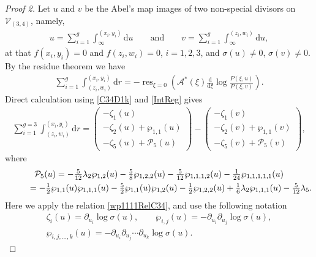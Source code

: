 \documentclass[11pt]{article}
\numberwithin{equation}{section}
\DeclareMathOperator{\res}{res}
\newcommand{\rmd}{\mathrm{d}}
\begin{document}
\begin{proof}[Proof 2]
Let $u$ and $v$ be the Abel's map images of two non-special divisors on $\mathcal{V}_{(3,4)}$, namely,
\begin{gather}\label{uDefC34}
 u = \sum_{i=1}^g \int_{\infty}^{(x_i,y_i)} \rmd u \qquad \text{and}\qquad v = \sum_{i=1}^g \int_{\infty}^{(z_i,w_i)} \rmd u,
\end{gather}
at that $f(x_i,y_i)=0$ and $f(z_i,w_i)=0$, $i=1,2,3$, and $\sigma(u) \neq 0$, $\sigma(v) \neq 0$. By the residue theorem we have
\begin{gather}\label{ZetaDef}
 \sum_{i=1}^{g} \int^{(x_i,y_i)}_{(z_i,w_i)} \rmd r = -\res_{\xi=0}\left( \mathcal{A}^{\ast}(\xi) \frac{\rmd}{\rmd \xi}\log \frac{P(\xi,u)}{P(\xi,v)}\right).
\end{gather}
Direct calculation using \eqref{C34D1k} and \eqref{IntReg} gives
\begin{gather}\label{zetaC34}
 \sum_{i=1}^{g=3} \int_{(z_i,w_i)}^{(x_i,y_i)} \rmd r = \begin{pmatrix}
 -\zeta_1(u) \\
 -\zeta_2(u) + \wp_{1,1}(u)\\
 -\zeta_5(u) + \mathcal{P}_5(u) \end{pmatrix}
 - \begin{pmatrix}
 -\zeta_1(v) \\
 -\zeta_2(v) + \wp_{1,1}(v)\\
 -\zeta_5(v) + \mathcal{P}_5(v) \end{pmatrix},
\end{gather}
where
\begin{gather*}
\mathcal{P}_5(u) = -\tfrac{5}{12} \lambda_2 \wp _{1,2}(u) -\tfrac{5}{8} \wp_{1,2,2}(u)
-\tfrac{5}{12} \wp_{1,1,1,2}(u) -\tfrac{1}{24} \wp_{1,1,1,1,1}(u)
\\
\hphantom{\mathcal{P}_5(u)}{} = -\tfrac{1}{2} \wp_{1,1}(u)\wp_{1,1,1}(u) - \tfrac{5}{2} \wp_{1,1}(u)\wp_{1,2}(u)
-\tfrac{1}{2} \wp_{1,2,2}(u) + \tfrac{1}{6} \lambda_2 \wp_{1,1,1}(u) - \tfrac{5}{12}\lambda_5.
\end{gather*}
Here we apply the relation \eqref{wp1111RelC34}, and use the following notation
\begin{gather}
\zeta_{i}(u) = \partial_{u_i} \log \sigma(u),\qquad \wp_{i,j}(u) = -\partial_{u_i} \partial_{u_j} \log \sigma(u),\nonumber \\
\wp_{i,j,\dots,k}(u) = - \partial_{u_i} \partial_{u_j} \cdots \partial_{u_k} \log \sigma(u).\label{wpNot}
\end{gather}


\end{proof}
\end{document}
